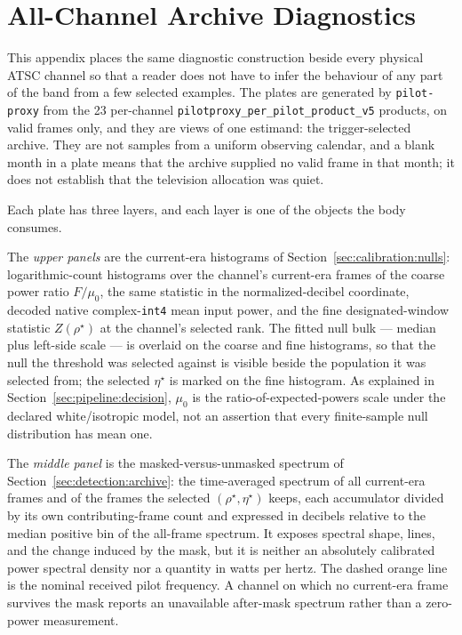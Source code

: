 \chapter{All-Channel Archive Diagnostics}
\label{app:archive-diagnostics}

This appendix places the same diagnostic construction beside every physical
ATSC channel so that a reader does not have to infer the behaviour of any part
of the band from a few selected examples.  The plates are generated by
\texttt{pilot-proxy} from the 23 per-channel
\texttt{pilotproxy\_per\_pilot\_product\_v5} products, on valid frames only,
and they are views of one estimand: the trigger-selected archive.  They are
not samples from a uniform observing calendar, and a blank month in a plate
means that the archive supplied no valid frame in that month; it does not
establish that the television allocation was quiet.

Each plate has three layers, and each layer is one of the objects the body
consumes.

The \emph{upper panels} are the current-era histograms of
Section~\ref{sec:calibration:nulls}: logarithmic-count histograms over the
channel's current-era frames of the coarse power ratio $F/\mu_0$, the same
statistic in the normalized-decibel coordinate, decoded native
complex-\texttt{int4} mean input power, and the fine designated-window
statistic $Z(\rho^\star)$ at the channel's selected rank.  The fitted null
bulk --- median plus left-side scale --- is overlaid on the coarse and fine
histograms, so that the null the threshold was selected against is visible
beside the population it was selected from; the selected $\eta^\star$ is
marked on the fine histogram.  As explained in
Section~\ref{sec:pipeline:decision}, $\mu_0$ is the ratio-of-expected-powers
scale under the declared white/isotropic model, not an assertion that every
finite-sample null distribution has mean one.

The \emph{middle panel} is the masked-versus-unmasked spectrum of
Section~\ref{sec:detection:archive}: the time-averaged spectrum of all
current-era frames and of the frames the selected $(\rho^\star,\eta^\star)$
keeps, each accumulator divided by its own contributing-frame count and
expressed in decibels relative to the median positive bin of the all-frame
spectrum.  It exposes spectral shape, lines, and the change induced by the
mask, but it is neither an absolutely calibrated power spectral density nor a
quantity in watts per hertz.  The dashed orange line is the nominal received
pilot frequency.  A channel on which no current-era frame survives the mask
reports an unavailable after-mask spectrum rather than a zero-power
measurement.

